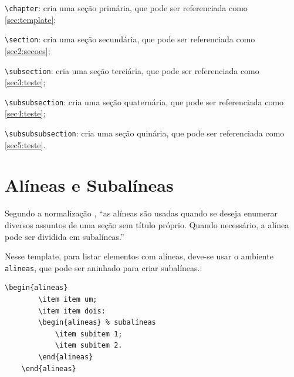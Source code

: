 \begin{alineas}
	\item \verb|\chapter|:  cria uma seção primária, que pode ser referenciada como \autoref{sec:template};
	\item \verb|\section|:  cria uma seção secundária, que pode ser referenciada como \autoref{sec2:secoes};
	\item \verb|\subsection|:  cria uma seção terciária, que pode ser referenciada como \autoref{sec3:teste};
	\item \verb|\subsubsection|:  cria uma seção quaternária, que pode ser referenciada como \autoref{sec4:teste};
	\item \verb|\subsubsubsection|:  cria uma seção quinária, que pode ser referenciada como \autoref{sec5:teste}.
\end{alineas}


\section{Alíneas e Subalíneas}
Segundo a normalização \cite{UFLA:2025}, ``as alíneas são usadas quando se deseja enumerar diversos assuntos de uma seção sem título próprio. Quando necessário, a alínea pode ser dividida em subalíneas.''

Nesse template, para listar elementos com alíneas, deve-se usar o ambiente \texttt{alineas}, que pode ser aninhado para criar subalíneas.: 
\begin{lstlisting}[language={[LaTeX]TeX}]
	\begin{alineas}
		\item item um;
		\item item dois:
		\begin{alineas} % subalíneas
			\item subitem 1;
			\item subitem 2.
		\end{alineas}
	\end{alineas}
\end{lstlisting}
\vspace{18pt}

